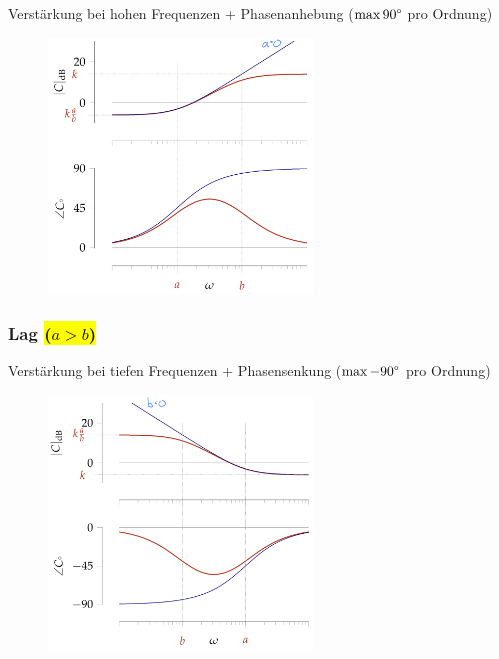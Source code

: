 \documentclass[
  10pt,
  a4paper,
  twocolumn]{article}
\numberwithin{equation}{section}
\begin{document}
Verstärkung bei hohen Frequenzen + Phasenanhebung (\(\max 90\degree\)
pro Ordnung)

\begin{figure}[H]

{\centering \includegraphics[width=7cm,height=\textheight]{images/paste-79.png}

}

\end{figure}

\hypertarget{lag}{%
\subsubsection{\texorpdfstring{Lag \hl{($a > b$)}}{Lag }}\label{lag}}

Verstärkung bei tiefen Frequenzen + Phasensenkung (\(\max -90\degree\)
pro Ordnung)

\begin{figure}[H]

{\centering \includegraphics[width=7cm,height=\textheight]{images/paste-80.png}

}

\end{figure}
\end{document}
